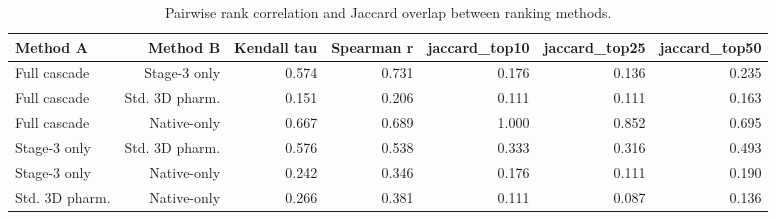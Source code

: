 \begin{table}[htbp]
\centering
\small
\caption{Pairwise rank correlation and Jaccard overlap between ranking methods.}
\label{tab:benchmark_pairwise}
\begin{tabular}{lrrrrrr}
\toprule
Method A & Method B & Kendall tau & Spearman r & jaccard\_top10 & jaccard\_top25 & jaccard\_top50 \\
\midrule
Full cascade & Stage-3 only & 0.574 & 0.731 & 0.176 & 0.136 & 0.235 \\
Full cascade & Std. 3D pharm. & 0.151 & 0.206 & 0.111 & 0.111 & 0.163 \\
Full cascade & Native-only & 0.667 & 0.689 & 1.000 & 0.852 & 0.695 \\
Stage-3 only & Std. 3D pharm. & 0.576 & 0.538 & 0.333 & 0.316 & 0.493 \\
Stage-3 only & Native-only & 0.242 & 0.346 & 0.176 & 0.111 & 0.190 \\
Std. 3D pharm. & Native-only & 0.266 & 0.381 & 0.111 & 0.087 & 0.136 \\
\bottomrule
\end{tabular}
\end{table}